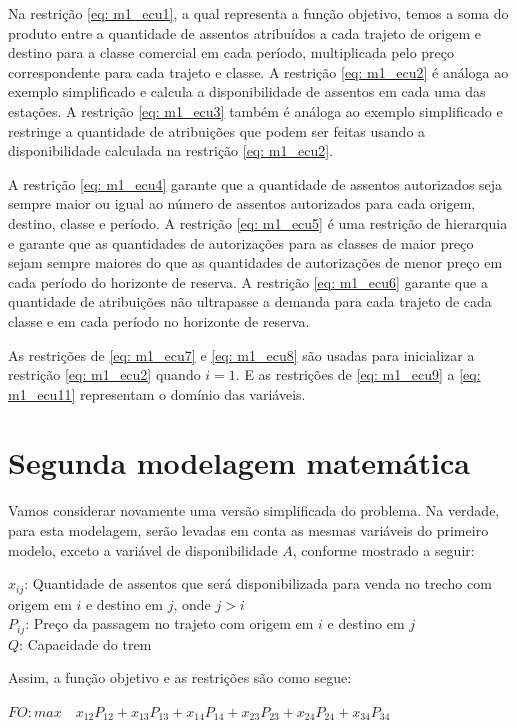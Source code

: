 Na restrição \ref{eq: m1_ecu1}, a qual representa a função objetivo, temos a soma do produto entre a quantidade de assentos atribuídos a cada trajeto de origem e destino para a classe comercial em cada período, multiplicada pelo preço correspondente para cada trajeto e classe. A restrição \ref{eq: m1_ecu2} é análoga ao exemplo simplificado e calcula a disponibilidade de assentos em cada uma das estações. A restrição \ref{eq: m1_ecu3} também é análoga ao exemplo simplificado e restringe a quantidade de atribuições que podem ser feitas usando a disponibilidade calculada na restrição \ref{eq: m1_ecu2}.

A restrição \ref{eq: m1_ecu4} garante que a quantidade de assentos autorizados seja sempre maior ou igual ao número de assentos autorizados para cada origem, destino, classe e período. A restrição \ref{eq: m1_ecu5} é uma restrição de hierarquia e garante que as quantidades de autorizações para as classes de maior preço sejam sempre maiores do que as quantidades de autorizações de menor preço em cada período do horizonte de reserva. A restrição \ref{eq: m1_ecu6} garante que a quantidade de atribuições não ultrapasse a demanda para cada trajeto de cada classe e em cada período no horizonte de reserva.

As restrições de \ref{eq: m1_ecu7} e \ref{eq: m1_ecu8} são usadas para inicializar a restrição \ref{eq: m1_ecu2} quando \(i = 1\). E as restrições de \ref{eq: m1_ecu9} a \ref{eq: m1_ecu11} representam o domínio das variáveis.

\section{Segunda modelagem matemática}\label{sec:modelo2}

Vamos considerar novamente uma versão simplificada do problema. Na verdade, para esta modelagem, serão levadas em conta as mesmas variáveis do primeiro modelo, exceto a variável de disponibilidade \(A\), conforme mostrado a seguir:

\noindent $x_{ij}$: Quantidade de assentos que será disponibilizada para venda no trecho com origem em $i$ e destino em $j$, onde $j>i$ \\
\noindent $P_{ij}$: Preço da passagem no trajeto com origem em $i$ e destino em $j$ \\
\noindent $Q$: Capacidade do trem

\noindent Assim, a função objetivo e as restrições são como segue:

$FO: max \quad x_{12}P_{12} + x_{13}P_{13} + x_{14}P_{14} + x_{23}P_{23} + x_{24}P_{24} + x_{34}P_{34}$

